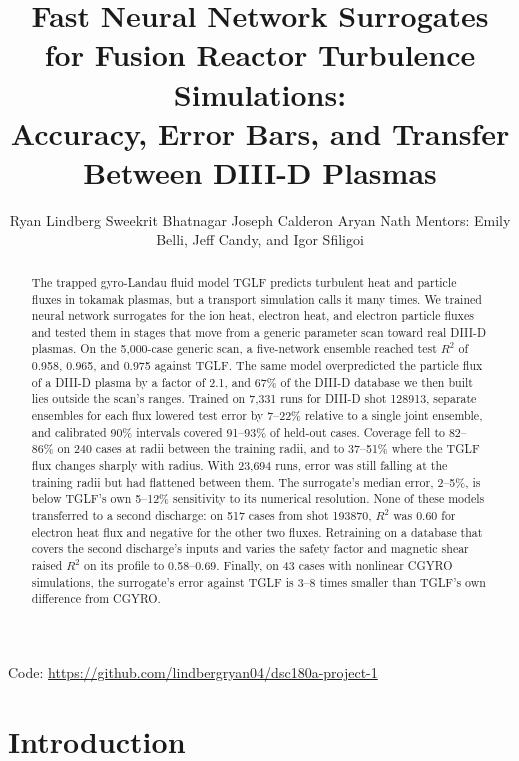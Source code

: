 \documentclass[12pt,letterpaper]{article}
\title{Fast Neural Network Surrogates for Fusion Reactor Turbulence Simulations:\\Accuracy, Error Bars, and Transfer Between DIII-D Plasmas}
\author{Ryan Lindberg \And
  Sweekrit Bhatnagar \And
  Joseph Calderon \And
  Aryan Nath \AND
  {\normalfont Mentors: Emily Belli, Jeff Candy, and Igor Sfiligoi}}
\begin{document}
\maketitle

\begin{abstract}
  The trapped gyro-Landau fluid model TGLF predicts turbulent heat and particle fluxes in
  tokamak plasmas, but a transport simulation calls it many times. We trained neural
  network surrogates for the ion heat, electron heat, and electron particle fluxes and
  tested them in stages that move from a generic parameter scan toward real DIII-D
  plasmas. On the 5,000-case generic scan, a five-network ensemble reached test $R^2$ of
  0.958, 0.965, and 0.975 against TGLF. The same model overpredicted the particle flux of a
  DIII-D plasma by a factor of 2.1, and 67\% of the DIII-D database we then built lies
  outside the scan's ranges. Trained on 7,331 runs for DIII-D shot 128913, separate
  ensembles for each flux lowered test error by 7--22\% relative to a single joint
  ensemble, and calibrated 90\% intervals covered 91--93\% of held-out cases. Coverage fell
  to 82--86\% on 240 cases at radii between the training radii, and to 37--51\% where the
  TGLF flux changes sharply with radius. With 23,694 runs, error was still falling at the
  training radii but had flattened between them. The surrogate's median error, 2--5\%, is
  below TGLF's own 5--12\% sensitivity to its numerical resolution. None of these models
  transferred to a second discharge: on 517 cases from shot 193870, $R^2$ was 0.60 for
  electron heat flux and negative for the other two fluxes. Retraining on a database that
  covers the second discharge's inputs and varies the safety factor and magnetic shear
  raised $R^2$ on its profile to 0.58--0.69. Finally, on 43 cases with nonlinear CGYRO
  simulations, the surrogate's error against TGLF is 3--8 times smaller than TGLF's own
  difference from CGYRO.
\end{abstract}

\begin{center}
  Code: \url{https://github.com/lindbergryan04/dsc180a-project-1}
\end{center}

\section{Introduction}
\label{sec:intro}
\end{document}
